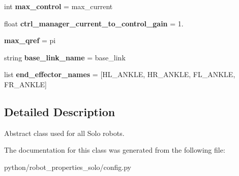 \begin{DoxyCompactItemize}
\item 
\mbox{\label{classrobot__properties__solo_1_1config_1_1SoloAbstract_adcf97e62522b414c73064c5bce74d793}} 
int {\bfseries max\+\_\+control} = max\+\_\+current
\item 
\mbox{\label{classrobot__properties__solo_1_1config_1_1SoloAbstract_ae91d562ea5d55439339d14eaa70abdd7}} 
float {\bfseries ctrl\+\_\+manager\+\_\+current\+\_\+to\+\_\+control\+\_\+gain} = 1.
\item 
\mbox{\label{classrobot__properties__solo_1_1config_1_1SoloAbstract_ac55924d17dca3b93df500d07ebee38ef}} 
{\bfseries max\+\_\+qref} = pi
\item 
\mbox{\label{classrobot__properties__solo_1_1config_1_1SoloAbstract_af111d2ba734ca0279bb9e65e201fa0b1}} 
string {\bfseries base\+\_\+link\+\_\+name} = \textquotesingle{}base\+\_\+link\textquotesingle{}
\item 
\mbox{\label{classrobot__properties__solo_1_1config_1_1SoloAbstract_a71d2087ae0591f8117e70b655fd95833}} 
list {\bfseries end\+\_\+effector\+\_\+names} = \mbox{[}\textquotesingle{}H\+L\+\_\+\+A\+N\+K\+LE\textquotesingle{}, \textquotesingle{}H\+R\+\_\+\+A\+N\+K\+LE\textquotesingle{}, \textquotesingle{}F\+L\+\_\+\+A\+N\+K\+LE\textquotesingle{}, \textquotesingle{}F\+R\+\_\+\+A\+N\+K\+LE\textquotesingle{}\mbox{]}
\end{DoxyCompactItemize}


\subsection{Detailed Description}
Abstract class used for all Solo robots. 



The documentation for this class was generated from the following file\+:\begin{DoxyCompactItemize}
\item 
python/robot\+\_\+properties\+\_\+solo/config.\+py\end{DoxyCompactItemize}

